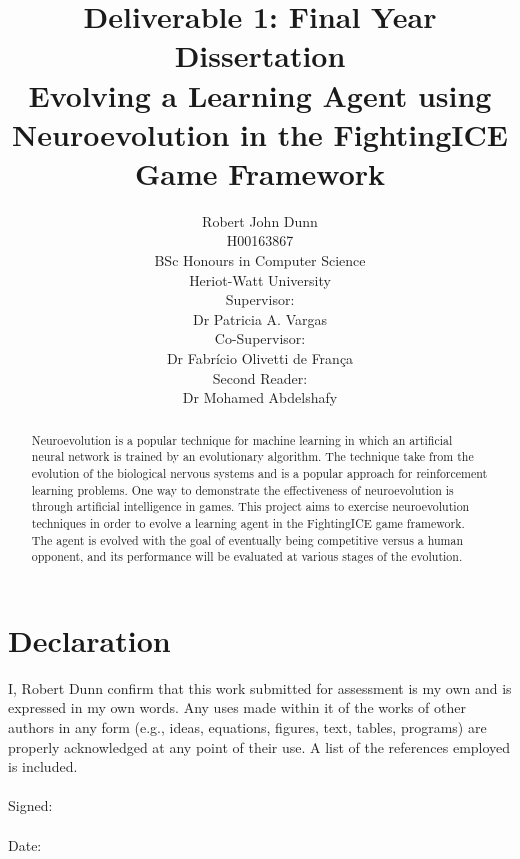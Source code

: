 \documentclass[11pt,a4paper]{article}
\begin{document}
\title{
Deliverable 1: Final Year Dissertation\\
\vspace{10mm}
Evolving a Learning Agent using Neuroevolution in the FightingICE Game Framework\\
\vspace{25mm}
}
\date{}
\author{Robert John Dunn\\
H00163867\\
BSc Honours in Computer Science\\
Heriot-Watt University\vspace{15mm}\\
Supervisor:\\
Dr Patricia A. Vargas\vspace{3mm}\\
Co-Supervisor:\\
Dr Fabrício Olivetti de França\vspace{3mm}\\
Second Reader:\\
Dr Mohamed Abdelshafy
}
\maketitle
\newpage
\vspace*{30mm}
\section*{Declaration}
I,  Robert Dunn confirm that this work submitted for assessment is my own and is expressed
in my own words. Any uses made within it of the works of other authors in any
form (e.g., ideas, equations, figures, text, tables, programs) are properly acknowledged
at any point of their use. A list of the references employed is included.\\
\\
Signed:\\
\\
Date: 
\newpage
\begin{abstract}
Neuroevolution is a popular technique for machine learning in which an artificial neural network is trained by an evolutionary algorithm. The technique take from the evolution of the biological nervous systems and is a popular approach for reinforcement learning problems. One way to demonstrate the effectiveness of neuroevolution is through artificial intelligence in games. This project aims to exercise neuroevolution techniques in order to evolve a learning agent in the FightingICE game framework. The agent is evolved with the goal of eventually being competitive versus a human opponent, and its performance will be evaluated at various stages of the evolution.
\end{abstract}
\newpage
\tableofcontents
\newpage
\end{document}
